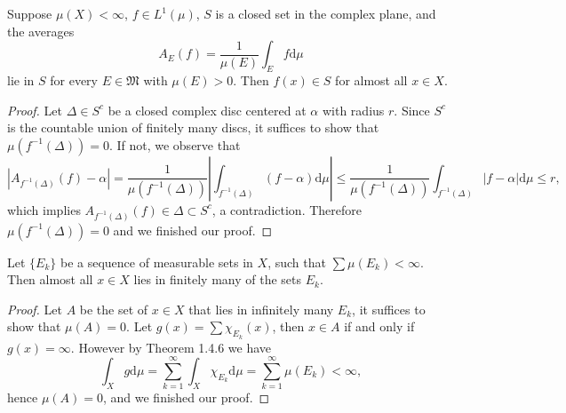 \begin{theorem}
Suppose $\mu(X)<\infty$, $f\in L^1(\mu)$, $S$ is a closed set in the complex plane, and the averages 
$$A_E(f)=\frac{1}{\mu(E)}\int_Ef\mathrm{d}\mu$$
lie in $S$ for every $E\in\mathfrak{M}$ with $\mu(E)>0$. Then $f(x)\in S$ for almost all $x\in X$.
\end{theorem}
\begin{proof}
Let $\Delta\in S^c$ be a closed complex disc centered at $\alpha$ with radius $r$. Since $S^c$ is the countable union of finitely many discs, it suffices to show that $\mu(f^{-1}(\Delta))=0$. If not, we observe that 
$$
\left| A_{f^{-1}\left( \Delta \right)}\left( f \right) -\alpha \right|=\frac{1}{\mu \left( f^{-1}\left( \Delta \right) \right)}\left| \int_{f^{-1}\left( \Delta \right)}{\left( f-\alpha \right) \mathrm{d}\mu} \right|\le \frac{1}{\mu \left( f^{-1}\left( \Delta \right) \right)}\int_{f^{-1}\left( \Delta \right)}{\left| f-\alpha \right|\mathrm{d}\mu}\le r,
$$
which implies $A_{f^{-1}\left( \Delta \right)}\left( f \right) \in \Delta \subset S^c$, a contradiction. Therefore $\mu(f^{-1}(\Delta))=0$ and we finished our proof.
\end{proof}
\begin{theorem}
Let $\{E_k\}$ be a sequence of measurable sets in $X$, such that $\sum\mu(E_k)<\infty$. Then almost all $x\in X$ lies in finitely many of the sets $E_k$.
\end{theorem}
\begin{proof}
Let $A$ be the set of $x\in X$ that lies in infinitely many $E_k$, it suffices to show that $\mu(A)=0$. Let $g(x)=\sum\chi_{E_k}(x)$, then $x\in A$ if and only if $g(x)=\infty$. However by Theorem 1.4.6 we have 
$$
\int_X{g\mathrm{d}\mu}=\sum_{k=1}^{\infty}{\int_X{\chi _{E_k}\mathrm{d}\mu}}=\sum_{k=1}^{\infty}{\mu \left( E_k \right)}<\infty ,
$$
hence $\mu(A)=0$, and we finished our proof.
\end{proof}
